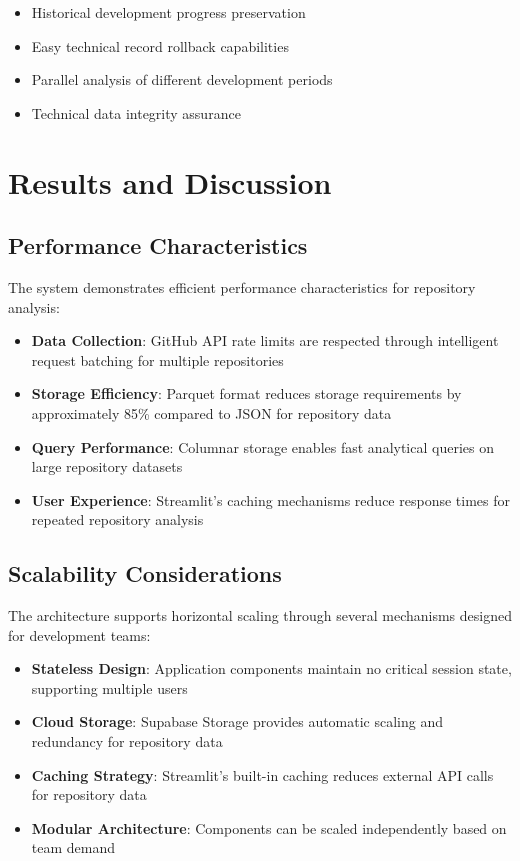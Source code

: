 \documentclass[12pt,a4paper]{article}
\begin{document}
\begin{itemize}
\item Historical development progress preservation
\item Easy technical record rollback capabilities
\item Parallel analysis of different development periods
\item Technical data integrity assurance
\end{itemize}


\section{Results and Discussion}

\subsection{Performance Characteristics}

The system demonstrates efficient performance characteristics for repository analysis:


\begin{itemize}
\item \textbf{Data Collection}: GitHub API rate limits are respected through intelligent request batching for multiple repositories
\item \textbf{Storage Efficiency}: Parquet format reduces storage requirements by approximately 85\% compared to JSON for repository data
\item \textbf{Query Performance}: Columnar storage enables fast analytical queries on large repository datasets
\item \textbf{User Experience}: Streamlit's caching mechanisms reduce response times for repeated repository analysis
\end{itemize}


\subsection{Scalability Considerations}

The architecture supports horizontal scaling through several mechanisms designed for development teams:


\begin{itemize}
\item \textbf{Stateless Design}: Application components maintain no critical session state, supporting multiple users
\item \textbf{Cloud Storage}: Supabase Storage provides automatic scaling and redundancy for repository data
\item \textbf{Caching Strategy}: Streamlit's built-in caching reduces external API calls for repository data
\item \textbf{Modular Architecture}: Components can be scaled independently based on team demand
\end{itemize}
\end{document}
